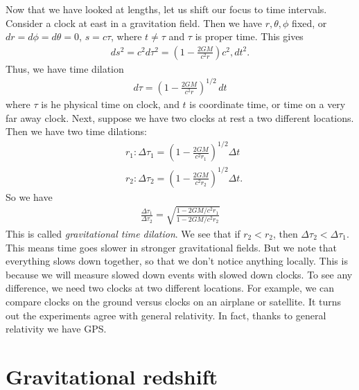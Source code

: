 \documentclass{book}
\theoremstyle{definition}
\newcommand{\f}[2]{\frac{#1}{#2}}
\newcommand{\lp}{\left(}
\newcommand{\rp}{\right)}
\begin{document}
Now that we have looked at lengths, let us shift our focus to time intervals. Consider a clock at east in a gravitation field. Then we have $r,\theta,\phi$ fixed, or $dr = d\phi = d\theta = 0$, $s = c\tau$, where $t \neq \tau$ and $\tau$ is proper time. This gives
\begin{align*}
ds^2 = c^2d\tau^2 = \lp 1 - \f{2GM}{c^2 r} \rp c^2, dt^2.
\end{align*}
Thus, we have time dilation 
\begin{align*}
\boxed{d\tau = \lp 1 - \f{2GM}{c^2 r} \rp^{1/2}\,dt}
\end{align*}
where $\tau$ is he physical time on clock, and $t$ is coordinate time, or time on a very far away clock. Next, suppose we have two clocks at rest a two different locations. Then we have two time dilations:
\begin{align*}
& r_1 : \Delta \tau_1 = \lp 1- \f{2GM}{c^2r_1} \rp^{1/2}\Delta t\\
& r_2 : \Delta \tau_2 = \lp 1- \f{2GM}{c^2r_2} \rp^{1/2}\Delta t.
\end{align*}
So we have
\begin{align*}
\boxed{\f{\Delta \tau_1}{\Delta \tau_2} = \sqrt{\f{1 - 2GM/c^2 r_1}{1 - 2GM/c^2 r_2}}}
\end{align*}
This is called \textit{gravitational time dilation}. We see that if $r_2 < r_2$, then $\Delta \tau_2< \Delta \tau_1$. This means time goes slower in stronger gravitational fields. But we note that everything slows down together, so that we don't notice anything locally. This is because we will measure slowed down events with slowed down clocks. To see any difference, we need two clocks at two different locations. For example, we can compare clocks on the ground versus clocks on an airplane or satellite. It turns out the experiments agree with general relativity. In fact, thanks to general relativity we have GPS.

\section{Gravitational redshift}
\end{document}
